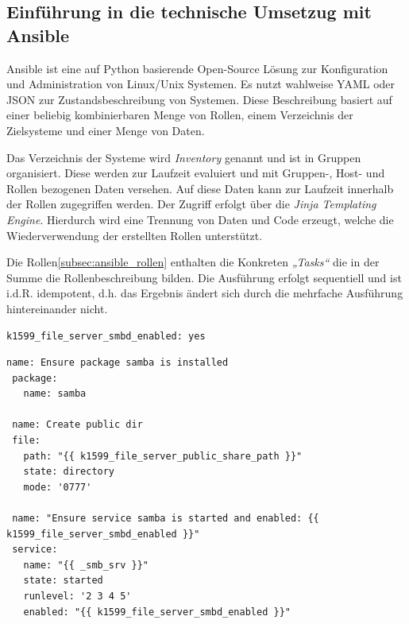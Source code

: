 \subsection{Einführung in die technische Umsetzug mit Ansible}
\label{subsec:ansiblecode}
Ansible ist eine auf Python basierende Open-Source Lösung zur Konfiguration und Administration von Linux/Unix Systemen. Es nutzt wahlweise YAML oder JSON zur Zustandsbeschreibung von Systemen. Diese Beschreibung basiert auf einer beliebig kombinierbaren Menge von Rollen, einem Verzeichnis der Zielsysteme und einer Menge von Daten.

Das Verzeichnis der Systeme wird \emph{Inventory} genannt und ist in Gruppen organisiert. Diese werden zur Laufzeit evaluiert und mit Gruppen-, Host- und Rollen bezogenen Daten versehen. Auf diese Daten kann zur Laufzeit innerhalb der Rollen zugegriffen werden. Der Zugriff erfolgt über die \textit{Jinja Templating Engine}. Hierdurch wird eine Trennung von Daten und Code erzeugt, welche die Wiederverwendung der erstellten Rollen unterstützt.

Die Rollen\ref{subsec:ansible_rollen} enthalten die Konkreten \emph{„Tasks“} die in der Summe die Rollenbeschreibung bilden. Die Ausführung erfolgt sequentiell und ist i.d.R. idempotent, d.h. das Ergebnis ändert sich durch die mehrfache Ausführung hintereinander nicht.

\begin{lstlisting}[label=code:public,caption=Auszug aus ansible/group\_vars/file\_server/public]
k1599_file_server_smbd_enabled: yes
\end{lstlisting}

\begin{lstlisting}[label=code:public2,caption=Auszug aus ansible/roles/k1599\_file\_server/tasks/main.yml]
 name: Ensure package samba is installed
 package:
   name: samba

 name: Create public dir
 file:
   path: "{{ k1599_file_server_public_share_path }}"
   state: directory
   mode: '0777'

 name: "Ensure service samba is started and enabled: {{ k1599_file_server_smbd_enabled }}"
 service:
   name: "{{ _smb_srv }}"
   state: started
   runlevel: '2 3 4 5'
   enabled: "{{ k1599_file_server_smbd_enabled }}"
\end{lstlisting}
\bigskip

